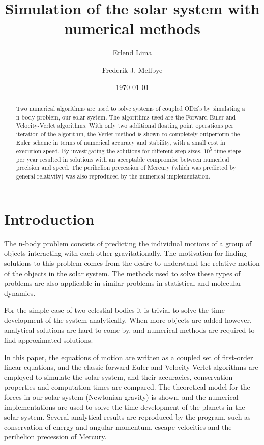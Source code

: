 \documentclass[aps,reprint]{revtex4-1}
\begin{document}
\title{Simulation of the solar system with numerical methods}
\author{Erlend Lima}
\author{Frederik J. Mellbye}
\date{\today}

\begin{abstract}
Two numerical algorithms are used to solve systems of coupled ODE's by simulating a n-body problem, our solar system.
The algorithms used are the Forward Euler and Velocity-Verlet algorithms. With only two additional floating point operations per
iteration of the algorithm, the Verlet method is shown to completely outperform the Euler scheme in terms of numerical accuracy and stability,
with a small cost in execution speed. By investigating the solutions for different step sizes, $10^5$ time steps per year resulted in
solutions with an acceptable compromise between numerical precision and speed. The perihelion precession of Mercury (which
was predicted by general relativity) was also reproduced by the numerical implementation.
\end{abstract}
\maketitle
\tableofcontents
\makeatletter
\let\toc@pre\relax
\let\toc@post\relax
\makeatother

\newpage

\section{Introduction}
\label{sec:introduction}
The n-body problem consists of predicting the individual motions of a group of objects
interacting with each other gravitationally. The motivation for finding solutions
to this problem comes from the desire to understand the relative motion of the
objects in the solar system. The methods used to solve these types of problems are also applicable in
similar problems in statistical and molecular dynamics.

For the simple case of two celestial bodies it is trivial to solve the time
development of the system analytically. When more objects are added however,
analytical solutions are hard to come by, and numerical methods are required to find
approximated solutions.

In this paper, the equations of motion are written as a coupled set of first-order linear equations, and
the classic forward Euler and Velocity Verlet algorithms are employed to simulate the solar system,
and their accuracies, conservation properties and computation times are compared. The theoretical
model for the forces in our solar system (Newtonian gravity) is shown, and the numerical implementations
are used to solve the time development of the planets in the solar system. Several analytical results
are reproduced by the program, such as conservation of energy and angular momentum, escape velocities
and the perihelion precession of Mercury.
\end{document}
